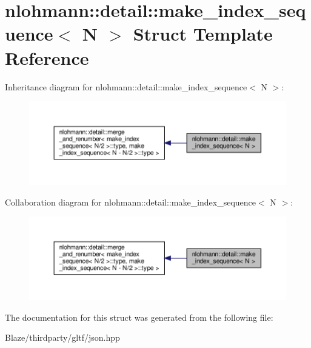 \hypertarget{structnlohmann_1_1detail_1_1make__index__sequence}{}\section{nlohmann\+:\+:detail\+:\+:make\+\_\+index\+\_\+sequence$<$ N $>$ Struct Template Reference}
\label{structnlohmann_1_1detail_1_1make__index__sequence}


Inheritance diagram for nlohmann\+:\+:detail\+:\+:make\+\_\+index\+\_\+sequence$<$ N $>$\+:\nopagebreak
\begin{figure}[H]
\begin{center}
\leavevmode
\includegraphics[width=350pt]{structnlohmann_1_1detail_1_1make__index__sequence__inherit__graph}
\end{center}
\end{figure}


Collaboration diagram for nlohmann\+:\+:detail\+:\+:make\+\_\+index\+\_\+sequence$<$ N $>$\+:\nopagebreak
\begin{figure}[H]
\begin{center}
\leavevmode
\includegraphics[width=350pt]{structnlohmann_1_1detail_1_1make__index__sequence__coll__graph}
\end{center}
\end{figure}


The documentation for this struct was generated from the following file\+:\begin{DoxyCompactItemize}
\item 
Blaze/thirdparty/gltf/json.\+hpp\end{DoxyCompactItemize}
